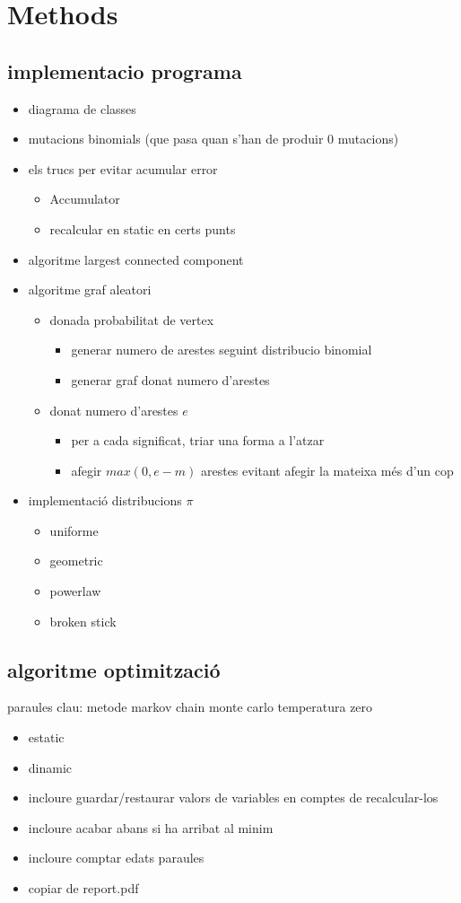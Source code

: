 \chapter{Methods}
\section{implementacio programa}
\begin{itemize}
\item diagrama de classes
\item mutacions binomials (que pasa quan s'han de produir 0 mutacions)
\item els trucs per evitar acumular error
  \begin{itemize}
  \item Accumulator
  \item recalcular en static en certs punts
  \end{itemize}
\item algoritme largest connected component
\item algoritme graf aleatori
  \begin{itemize}
  \item donada probabilitat de vertex
    \begin{itemize}
    \item generar numero de arestes seguint distribucio binomial
    \item generar graf donat numero d'arestes
    \end{itemize}
  \item donat numero d'arestes $e$
    \begin{itemize}
    \item per a cada significat, triar una forma a l'atzar
    \item afegir $max(0, e-m)$ arestes evitant afegir la mateixa més d'un cop
    \end{itemize}
  \end{itemize}
\item implementació distribucions $\pi$
  \begin{itemize}
  \item uniforme
  \item geometric
  \item powerlaw
  \item broken stick
  \end{itemize}
\end{itemize}
\section{algoritme optimització}
paraules clau: metode markov chain monte carlo temperatura zero
\begin{itemize}
\item estatic
\item dinamic
\item incloure guardar/restaurar valors de variables en comptes de
  recalcular-los
\item incloure acabar abans si ha arribat al minim
\item incloure comptar edats paraules
\item copiar de report.pdf
\end{itemize}
